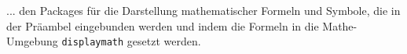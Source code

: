 
... den Packages für die Darstellung mathematischer Formeln und Symbole, die in der Präambel eingebunden werden und indem die Formeln in die Mathe-Umgebung \texttt{displaymath} gesetzt werden.
